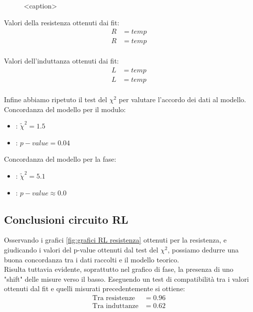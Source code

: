 \documentclass[letterpaper,12pt]{article}
\begin{document}
\begin{figure}[h!]
    \centering
    
    \caption{<caption>}
    \label{fig:grafici RL induttanza}
\end{figure}

Valori della resistenza ottenuti dai fit:
\begin{align*} %
    R &= temp \\
    R &= temp \\
\end{align*}

Valori dell'induttanza ottenuti dai fit:
\begin{align*} 
    L &= temp \\
    L &= temp \\
\end{align*}

Infine abbiamo ripetuto il test del $\chi^2$ per valutare l'accordo dei dati al modello. \\
Concordanza del modello per il modulo:
\begin{itemize} %
    \item: $\widetilde{\chi}^2 = 1.5$   
    \item: $p-value = 0.04$ 
\end{itemize}

Concordanza del modello per la fase:
\begin{itemize} 
    \item: $\widetilde{\chi}^2 = 5.1$   
    \item: $p-value \approx 0.0$
\end{itemize}

\subsection{Conclusioni circuito RL}

Osservando i grafici \ref{fig:grafici RL resistenza} ottenuti per la resistenza, e giudicando i valori del p-value ottenuti dal test del $\chi^2$, possiamo dedurre una buona concordanza tra i dati raccolti e il modello teorico. \\
Risulta tuttavia evidente, soprattutto nel grafico di fase, la presenza di uno "shift" delle misure verso il basso. Eseguendo un test di compatibilità tra i valori ottenuti dal fit e quelli misurati precedentemente si ottiene:
\begin{align*}
    \text{Tra resistenze} & = 0.96 \\
    \text{Tra induttanze} & = 0.62
\end{align*} 
\end{document}
